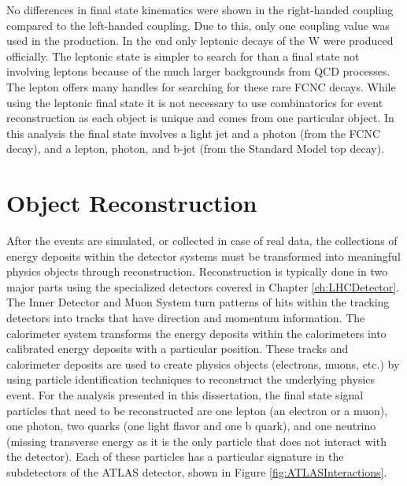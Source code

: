No differences in final state kinematics were shown in the right-handed coupling compared to the left-handed coupling.  Due to this, only one coupling value was used in the production.  In the end only leptonic decays of the W were produced officially.  The leptonic state is simpler to search for than a final state not involving leptons because of the much larger backgrounds from QCD processes.  The lepton offers many handles for searching for these rare FCNC decays.  While using the leptonic final state it is not necessary to use combinatorics for event reconstruction as each object is unique and comes from one particular object.  In this analysis the final state involves a light jet and a photon (from the FCNC decay), and a lepton, photon, and b-jet (from the Standard Model top decay).




\section{Object Reconstruction}

After the events are simulated, or collected in case of real data, the collections of energy deposits within the detector systems must be transformed into meaningful physics objects through reconstruction.  Reconstruction is typically done in two major parts using the specialized detectors covered in Chapter \ref{ch:LHCDetector}.  The Inner Detector and Muon System turn patterns of hits within the tracking detectors into tracks that have direction and momentum information.  The calorimeter system transforms the energy deposits within the calorimeters into calibrated energy deposits with a particular position.  These tracks and calorimeter deposits are used to create physics objects (electrons, muons, etc.) by using particle identification techniques to reconstruct the underlying physics event.  For the analysis presented in this dissertation, the final state signal particles that need to be reconstructed are one lepton (an electron or a muon), one photon, two quarks (one light flavor and one b quark), and one neutrino (missing transverse energy as it is the only particle that does not interact with the detector).  Each of these particles has a particular signature in the subdetectors of the ATLAS detector, shown in Figure \ref{fig:ATLASInteractions}.

